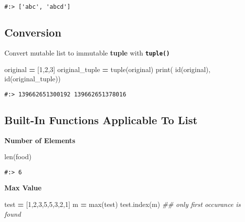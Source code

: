 \documentclass[
]{book}
\newenvironment{Shaded}{\begin{snugshade}}{\end{snugshade}}
\newcommand{\BuiltInTok}[1]{#1}
\newcommand{\CommentTok}[1]{\textcolor[rgb]{0.37,0.37,0.37}{\textit{#1}}}
\newcommand{\DecValTok}[1]{\textcolor[rgb]{0.06,0.06,0.06}{#1}}
\newcommand{\NormalTok}[1]{#1}
\newcommand{\OperatorTok}[1]{\textcolor[rgb]{0.43,0.43,0.43}{\textbf{#1}}}
\begin{document}
\begin{verbatim}
#:> ['abc', 'abcd']
\end{verbatim}

\hypertarget{conversion}{%
\subsection{Conversion}\label{conversion}}

Convert mutable list to immutable \textbf{tuple} with \textbf{\texttt{tuple()}}

\begin{Shaded}
\begin{Highlighting}[]
\NormalTok{original }\OperatorTok{=}\NormalTok{ [}\DecValTok{1}\NormalTok{,}\DecValTok{2}\NormalTok{,}\DecValTok{3}\NormalTok{]}
\NormalTok{original\_tuple }\OperatorTok{=} \BuiltInTok{tuple}\NormalTok{(original)}
\BuiltInTok{print}\NormalTok{( }\BuiltInTok{id}\NormalTok{(original),}
       \BuiltInTok{id}\NormalTok{(original\_tuple))}
\end{Highlighting}
\end{Shaded}

\begin{verbatim}
#:> 139662651300192 139662651378016
\end{verbatim}

\hypertarget{built-in-functions-applicable-to-list}{%
\subsection{Built-In Functions Applicable To List}\label{built-in-functions-applicable-to-list}}

\textbf{Number of Elements}

\begin{Shaded}
\begin{Highlighting}[]
\BuiltInTok{len}\NormalTok{(food)}
\end{Highlighting}
\end{Shaded}

\begin{verbatim}
#:> 6
\end{verbatim}

\textbf{Max Value}

\begin{Shaded}
\begin{Highlighting}[]
\NormalTok{test }\OperatorTok{=}\NormalTok{ [}\DecValTok{1}\NormalTok{,}\DecValTok{2}\NormalTok{,}\DecValTok{3}\NormalTok{,}\DecValTok{5}\NormalTok{,}\DecValTok{5}\NormalTok{,}\DecValTok{3}\NormalTok{,}\DecValTok{2}\NormalTok{,}\DecValTok{1}\NormalTok{]}
\NormalTok{m }\OperatorTok{=} \BuiltInTok{max}\NormalTok{(test)}
\NormalTok{test.index(m)  }\CommentTok{\#\# only first occurance is found}
\end{Highlighting}
\end{Shaded}
\end{document}
